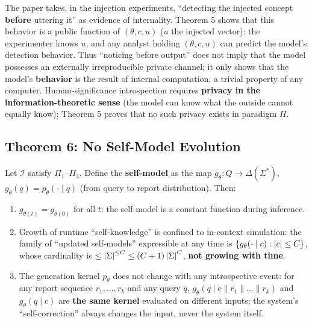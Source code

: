 \begin{remark}
The paper takes, in the injection experiments, ``detecting the injected concept \textbf{before}
uttering it'' as evidence of internality. Theorem 5 shows that this behavior is a public
function of $(\theta, c, u)$ ($u$ the injected vector): the experimenter knows $u$, and any
analyst holding $(\theta, c, u)$ can predict the model's detection behavior. Thus ``noticing
before output'' does not imply that the model possesses an externally irreproducible private
channel; it only shows that the model's \textbf{behavior} is the result of internal
computation, a trivial property of any computer. Human-significance introspection requires
\textbf{privacy in the information-theoretic sense} (the model can know what the outside
cannot equally know); Theorem 5 proves that no such privacy exists in paradigm $\Pi$.
\end{remark}

\subsection{Theorem 6: No Self-Model Evolution}

\begin{theorem}\label{thm:selfmodel}
Let $\mathcal{I}$ satisfy $\Pi_1$--$\Pi_3$. Define the \textbf{self-model} as the map
$g_\theta: Q \to \Delta(\Sigma^{*})$, $g_\theta(q) = p_\theta(\cdot \mid q)$
(from query to report distribution). Then:

\begin{enumerate}[align=left, labelwidth=!, labelsep=0.8em, leftmargin=!, itemindent=0pt]
\item[(\textbf{6a})\textbf{Constant at inference}] $g_{\theta(t)} = g_{\theta(0)}$ for all
$t$: the self-model is a constant function during inference.
\item[(\textbf{6b})\textbf{Capped expressivity}] Growth of runtime ``self-knowledge'' is
confined to in-context simulation: the family of ``updated self-models'' expressible at any time
is $\{ g_\theta(\cdot \mid c) : \left\lvert c \right\rvert \le C \}$, whose cardinality is
$\le \left\lvert \Sigma \right\rvert^{\le C} \le (C+1)\left\lvert \Sigma \right\rvert^{C}$, \textbf{not growing with time}.
\item[(\textbf{6c})\textbf{No plasticity}] The generation kernel $p_\theta$ does not change
with any introspective event: for any report sequence $r_1, \dots, r_k$ and any query $q$,
$g_\theta(q \mid c \| r_1 \| \dots \| r_k)$ and $g_\theta(q \mid c)$ are \textbf{the same
kernel} evaluated on different inputs; the system's ``self-correction'' always changes the
input, never the system itself.
\end{enumerate}
\end{theorem}

